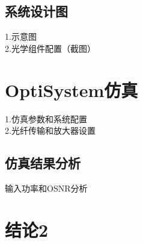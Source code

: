 \documentclass[12pt, a4paper, oneside]{article}
\begin{document}
\begin{spacing}{2.0}
\subsection{系统设计图}
1.示意图\\
2.光学组件配置（截图）




\section{OptiSystem仿真}
1.仿真参数和系统配置\\
2.光纤传输和放大器设置


\subsection{仿真结果分析}
输入功率和OSNR分析

\section{结论2}

\end{spacing}{}


\end{document}
